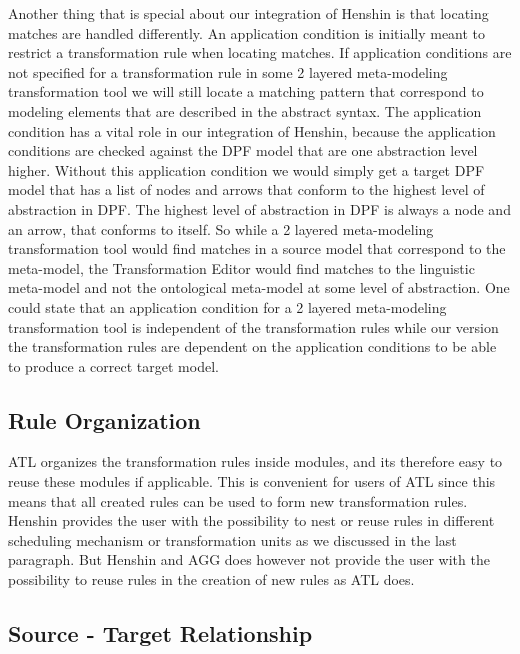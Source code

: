 Another thing that is special about our integration of Henshin is that locating
matches are handled differently. An application condition is initially meant to
restrict a transformation rule when locating matches. If application conditions
are not specified for a transformation rule in some 2 layered meta-modeling
transformation tool we will still locate a matching pattern that correspond to
modeling elements that are described in the abstract syntax. The application
condition has a vital role in our integration of Henshin, because the
application conditions are checked against the DPF model that are one
abstraction level higher. Without this application condition we would simply get
a target DPF model that has a list of nodes and arrows that conform to the
highest level of abstraction in DPF. The highest level of abstraction in DPF
is always a node and an arrow, that conforms to itself. So while a 2 layered
meta-modeling transformation tool would find matches in a source model that
correspond to the meta-model, the Transformation Editor would find matches to
the linguistic meta-model and not the ontological meta-model at some level of
abstraction. One could state that an application condition for a 2 layered
meta-modeling transformation tool is independent of the transformation rules
while our version the transformation rules are dependent on the application
conditions to be able to produce a correct target model. 

\subsection{Rule Organization}

ATL organizes the transformation rules inside modules, and its therefore easy to
reuse these modules if applicable. This is convenient for
users of ATL since this means that all created rules can be used to form new
transformation rules. Henshin provides the user with the possibility to nest or 
reuse rules in different scheduling mechanism or transformation units
as we discussed in the last paragraph. But Henshin and AGG does however not
provide the user with the possibility to reuse rules in the creation of new
rules as ATL does. 

\subsection{Source - Target Relationship}

